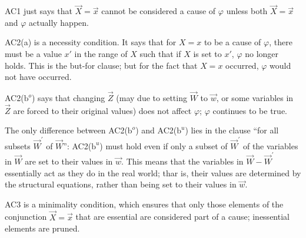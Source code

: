 \documentclass{article}
\begin{document}
AC1 just says that $\vec{X}=\vec{x}$ cannot be considered a cause of $\varphi$ unless both $\vec{X}=\vec{x}$ and $\varphi$ actually happen.

AC2(a) is a necessity condition. It says that for $X = x$ to be a cause of $\varphi$, there must be a value $x′$ in the range of $X$ such that if $X$ is set to $x'$, $\varphi$ no longer holds. This is the but-for clause; but for the fact that $X=x$ occurred, $\varphi$ would not have occurred.

AC2($\mathrm{b}^{o}$) says that changing $\vec{Z}$ (may due to setting $\vec{W}$ to $\vec{w}$, or some variables in $\vec{Z}$ are forced to their original values) does not affect $\varphi$; $\varphi$ continues to be true.

The only difference between AC2($\mathrm{b}^{o}$) and AC2($\mathrm{b}^{u}$) lies in the clause ``for all subsets $\vec{W}^{\prime}$ of $\vec{W}$'': AC2($\mathrm{b}^{u}$) must hold even if only a subset of $\vec{W}^{\prime}$ of the variables in $\vec{W}$ are set to their values in $\vec{w}$. This means that the variables in $\vec{W}-\vec{W}^{\prime}$ essentially act as they do in the real world; thar is, their values are determined by the structural equations, rather than being set to their values in $\vec{w}$.

AC3 is a minimality condition, which ensures that only those elements of the conjunction $\vec{X}=\vec{x}$ that are essential are considered part of a cause; inessential elements are pruned.
\end{document}
